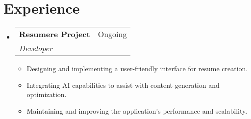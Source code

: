 \documentclass[letterpaper,11pt]{article}
\makeatletter
\newcommand{\resumeItem}[1]{
\item\small{
{#1 \vspace{-2pt}}
}
}
\newcommand{\resumeSubheading}[4]{
\vspace{-2pt}\item
\begin{tabular*}{0.97\textwidth}[t]{l@{\extracolsep{\fill}}r}
\textbf{#1} & #2 \\
\textit{\small#3} & \textit{\small #4} \\
\end{tabular*}\vspace{-7pt}
}
\newcommand{\resumeSubHeadingListStart}{\begin{itemize}[leftmargin=0.15in, label={}]}
\newcommand{\resumeSubHeadingListEnd}{\end{itemize}}
\newcommand{\resumeItemListStart}{\begin{itemize}}
\newcommand{\resumeItemListEnd}{\end{itemize}\vspace{-5pt}}
\makeatother
\begin{document}
\section{Experience}
\resumeSubHeadingListStart
\resumeSubheading{Resumere Project}{Ongoing}{Developer}{}
\resumeItemListStart
\resumeItem{Designing and implementing a user-friendly interface for resume creation.}
\resumeItem{Integrating AI capabilities to assist with content generation and optimization.}
\resumeItem{Maintaining and improving the application's performance and scalability.}
\resumeItemListEnd
\resumeSubHeadingListEnd

\end{document}
